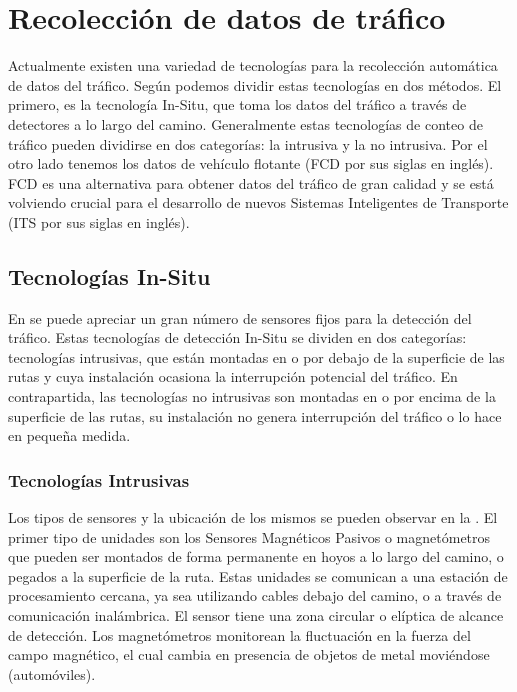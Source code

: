 \chapter{Recolección de datos de tráfico}

Actualmente existen una variedad de tecnologías para la recolección automática de datos del tráfico. Según \cite{mimbela2003summary} podemos dividir estas tecnologías en dos métodos. El primero, es la tecnología In-Situ, que toma los datos del tráfico a través de detectores a lo largo del camino. Generalmente estas tecnologías de conteo de tráfico pueden dividirse en dos categorías: la intrusiva y la no intrusiva. Por el otro lado tenemos los datos de vehículo flotante (FCD por sus siglas en inglés). FCD es una alternativa para obtener datos del tráfico de gran calidad y se está volviendo crucial para el desarrollo de nuevos Sistemas Inteligentes de Transporte (ITS por sus siglas en inglés).

\section{Tecnologías In-Situ}

En \cite{klein2006traffic} se puede apreciar un gran número de sensores fijos para la detección del tráfico. Estas tecnologías de detección In-Situ se dividen en dos categorías: tecnologías intrusivas, que están montadas en o por debajo de la superficie de las rutas y cuya instalación ocasiona la interrupción potencial del tráfico. En contrapartida, las tecnologías no intrusivas son montadas en o por encima de la superficie de las rutas, su instalación no genera interrupción del tráfico o lo hace en pequeña medida. 

\subsection{Tecnologías Intrusivas}

Los tipos de sensores y la ubicación de los mismos se pueden observar en la . El primer tipo de unidades son los Sensores Magnéticos Pasivos o magnetómetros que pueden ser montados de forma permanente en hoyos a lo largo del camino, o pegados a la superficie de la ruta. Estas unidades se comunican a una estación de procesamiento cercana, ya sea utilizando cables debajo del camino, o a través de comunicación inalámbrica. El sensor tiene una zona circular o elíptica de alcance de detección. Los magnetómetros monitorean la fluctuación en la fuerza del campo magnético, el cual cambia en presencia de objetos de metal moviéndose (automóviles).

